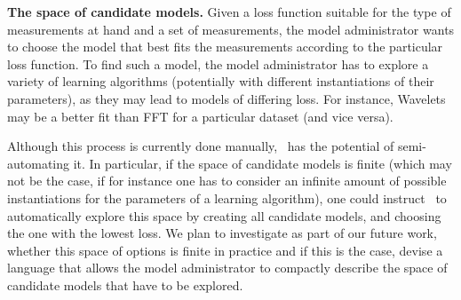 {\bf The space of candidate models.} Given a loss function suitable for the type of measurements at hand and a set of measurements, the model administrator wants to choose the model that best fits the measurements according to the particular loss function. To find such a model, the model administrator has to explore a variety of learning algorithms (potentially with different instantiations of their parameters), as they may lead to models of differing loss. For instance, Wavelets may be a better fit than FFT for a particular dataset (and vice versa).
%

Although this process is currently done manually, \projName\ has the potential of semi-automating it. In particular, if the space of candidate models is finite (which may not be the case, if for instance one has to consider an infinite amount of possible instantiations for the parameters of a learning algorithm), one could instruct \projName\ to automatically explore this space by creating all candidate models, and choosing the one with the lowest loss. We plan to investigate as part of our future work, whether this space of options is finite in practice and if this is the case, devise a language that allows the model administrator to compactly describe the space of candidate models that have to be explored.